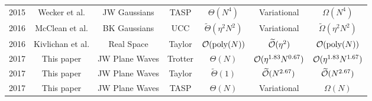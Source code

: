 \documentclass[superscriptaddress,aps,pra,nofootinbib,notitlepage,10pt,longbibliography]{revtex4-1}
\begin{document}
\begin{table*}[t]
\begin{tabular}{c|c|c|c|c|c||c}
%
%
2015 & Wecker et al. \cite{Wecker2015a} & JW Gaussians & TASP & $\Theta(N^4)$ & Variational & $\Omega(N^{4})$ \\
%
2016 & McClean et al. \cite{McClean2015} & BK Gaussians & UCC & $\widetilde{\Theta}(\eta^2 N^2)$ & Variational & $\widetilde{\Omega}(\eta^2 N^2)$ \\
%
2016  & Kivlichan et al. \cite{Kivlichan2016}  & Real Space & Taylor & ${\cal O}(\textrm{poly}(N))$ & $\widetilde{\cal O}(\eta^2)$ & ${\cal O}(\textrm{poly}(N))$\\
%
2017 & This paper & JW Plane Waves & Trotter  & $\Theta(N)$ & ${\cal O}(\eta^{1.83} N^{0.67})$ & ${\cal O}(\eta^{1.83} N^{1.67})$ \\
%
2017 & This paper & JW Plane Waves & Taylor & $\widetilde{\Theta}(1)$ & $\widetilde{\cal O}(N^{2.67})$ & $\widetilde{\cal O}(N^{2.67})$ \\
%
2017 & This paper & JW Plane Waves & TASP & $\Theta(N)$ & Variational & $\Omega(N)$ \\
\hline
\end{tabular}

\end{table*}
\end{document}
